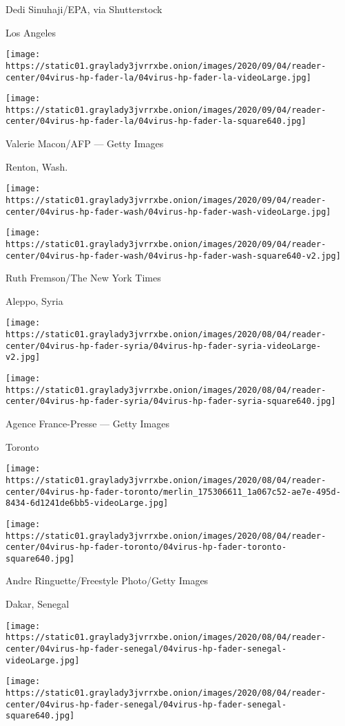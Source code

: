  Dedi Sinuhaji/EPA, via Shutterstock

Los Angeles

\texttt{[image: https://static01.graylady3jvrrxbe.onion/images/2020/09/04/reader-center/04virus-hp-fader-la/04virus-hp-fader-la-videoLarge.jpg]}

\texttt{[image: https://static01.graylady3jvrrxbe.onion/images/2020/09/04/reader-center/04virus-hp-fader-la/04virus-hp-fader-la-square640.jpg]}

 Valerie Macon/AFP --- Getty Images

Renton, Wash.

\texttt{[image: https://static01.graylady3jvrrxbe.onion/images/2020/09/04/reader-center/04virus-hp-fader-wash/04virus-hp-fader-wash-videoLarge.jpg]}

\texttt{[image: https://static01.graylady3jvrrxbe.onion/images/2020/09/04/reader-center/04virus-hp-fader-wash/04virus-hp-fader-wash-square640-v2.jpg]}

 Ruth Fremson/The New York Times

Aleppo, Syria

\texttt{[image: https://static01.graylady3jvrrxbe.onion/images/2020/08/04/reader-center/04virus-hp-fader-syria/04virus-hp-fader-syria-videoLarge-v2.jpg]}

\texttt{[image: https://static01.graylady3jvrrxbe.onion/images/2020/08/04/reader-center/04virus-hp-fader-syria/04virus-hp-fader-syria-square640.jpg]}

 Agence France-Presse --- Getty Images

Toronto

\texttt{[image: https://static01.graylady3jvrrxbe.onion/images/2020/08/04/reader-center/04virus-hp-fader-toronto/merlin\_175306611\_1a067c52-ae7e-495d-8434-6d1241de6bb5-videoLarge.jpg]}

\texttt{[image: https://static01.graylady3jvrrxbe.onion/images/2020/08/04/reader-center/04virus-hp-fader-toronto/04virus-hp-fader-toronto-square640.jpg]}

 Andre Ringuette/Freestyle Photo/Getty Images

Dakar, Senegal

\texttt{[image: https://static01.graylady3jvrrxbe.onion/images/2020/08/04/reader-center/04virus-hp-fader-senegal/04virus-hp-fader-senegal-videoLarge.jpg]}

\texttt{[image: https://static01.graylady3jvrrxbe.onion/images/2020/08/04/reader-center/04virus-hp-fader-senegal/04virus-hp-fader-senegal-square640.jpg]}

